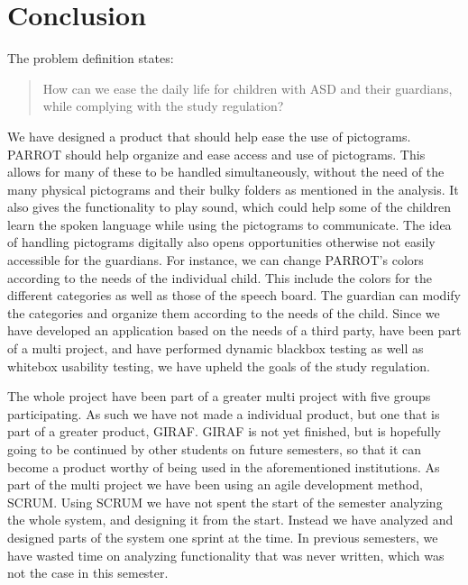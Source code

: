 \chapter{Conclusion}

The problem definition states:
\begin{quote}
How can we ease the daily life for children with ASD and their guardians, while complying with the study regulation?
\end{quote}

We have designed a product that should help ease the use of pictograms. 
PARROT should help organize and ease access and use of pictograms. This allows for many of these to be handled simultaneously, without the need of the many physical pictograms and their bulky folders as mentioned in the analysis.\newline
It also gives the functionality to play sound, which could help some of the children learn the spoken language while using the pictograms to communicate. 
The idea of handling pictograms digitally also opens opportunities otherwise not easily accessible for the guardians.
For instance, we can change PARROT's colors according to the needs of the individual child. This include the colors for the different categories as well as those of the speech board.
The guardian can modify the categories and organize them according to the needs of the child.\newline
Since we have developed an application based on the needs of a third party, have been part of a multi project, and have performed dynamic blackbox testing as well as whitebox usability testing, we have upheld the goals of the study regulation.\newline

The whole project have been part of a greater multi project with five groups participating. 
As such we have not made a individual product, but one that is part of a greater product, GIRAF.  
GIRAF is not yet finished, but is hopefully going to be continued by other students on future semesters, so that it can become a product worthy of being used in the aforementioned institutions.\newline
As part of the multi project we have been using an agile development method, SCRUM.
Using SCRUM we have not spent the start of the semester analyzing the whole system, and designing it from the start. Instead we have analyzed and designed parts of the system one sprint at the time.
In previous semesters, we have wasted time on analyzing functionality that was never written, which was not the case in this semester.\newline
